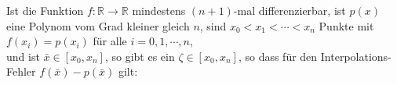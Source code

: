 \begin{Satz} 
  \label{satz:interpolationsFehler}
  Ist die Funktion $f:\mathbb{R} \rightarrow \mathbb{R}$ mindestens $(n+1)$-mal differenzierbar, ist $p(x)$ eine Polynom vom Grad
  kleiner gleich $n$, sind $x_0 < x_1 < \cdots < x_n$ Punkte mit
  \\[0.2cm]
  \hspace*{1.3cm}
  $f(x_i) = p(x_i)$ f\"ur alle $i=0,1,\cdots,n$,
  \\[0.2cm]
  und ist $\bar{x} \in [x_0,x_n]$, so gibt es ein $\zeta\in [x_0,x_n]$, so dass f\"ur
  den Interpolations-Fehler $f(\bar{x}) - p(\bar{x})$ gilt: 
  \\[0.2cm]
  \hspace*{1.3cm}
\colorbox{orange}{}
\end{Satz}

